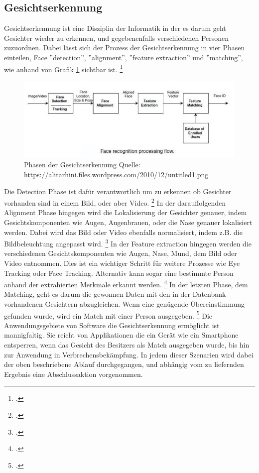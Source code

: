 \documentclass[12pt, a4paper]{scrbook}
\begin{document}
\subsection{Gesichtserkennung}
Gesichtserkennung ist eine Disziplin der Informatik in der es darum geht Gesichter wieder zu erkennen, und gegebenenfalls verschiedenen Personen zuzuordnen. Dabei lässt sich der Prozess der
Gesichtserkennung in vier Phasen einteilen, Face ''detection'', ''alignment'', ''feature extraction'' und ''matching'', wie anhand von Grafik \ref{fig:Face Recognition} sichtbar ist.
\footcite[Vgl. ][2]{HandbookFaceRec}
\begin{figure}[h]
\includegraphics[width=\linewidth]{Bilder/FaceRecognition.png}
\caption{ Phasen der Gesichtserkennung \newline Quelle: https://alitarhini.files.wordpress.com/2010/12/untitled1.png }
\label{fig:Face Recognition}
\end{figure}
Die Detection Phase ist dafür verantwortlich um zu erkennen ob Gesichter vorhanden sind in einem Bild, oder aber Video.
\footcite[Vgl. ][2]{HandbookFaceRec}
In der darauffolgenden Alignment Phase hingegen wird die Lokalisierung der Gesichter genauer, indem Gesichtskomponenten wie Augen, Augenbrauen, oder die Nase genauer lokalisiert werden. Dabei
wird das Bild oder Video ebenfalls normalisiert, indem z.B. die Bildbeleuchtung angepasst wird.
\footcite[Vgl. ][2]{HandbookFaceRec}
In der Feature extraction hingegen werden die verschiedenen Gesichtskomponenten wie Augen, Nase, Mund, dem Bild oder Video entnommen. Dies ist ein wichtiger Schritt für weitere Prozesse wie
Eye Tracking oder Face Tracking. Alternativ kann sogar eine bestimmte Person anhand der extrahierten Merkmale erkannt werden.
\footcite[Vgl. ][Abstract]{IEEE}
In der letzten Phase, dem Matching, geht es darum die gewonnen Daten mit den in der Datenbank vorhandenen Gesichtern abzugleichen. Wenn eine genügende Übereinstimmung gefunden wurde, wird ein
Match mit einer Person ausgegeben.
\footcite[Vgl. ][3]{HandbookFaceRec}
Die Anwendungsgebiete von Software die Gesichtserkennung ermöglicht ist mannigfaltig. Sie reicht von Applikationen die ein Gerät wie ein Smartphone entsperren, wenn das Gesicht des Besitzers als
Match ausgegeben wurde, bis hin zur Anwendung in Verbrechensbekämpfung. In jedem dieser Szenarien wird dabei der oben beschriebene Ablauf durchgegangen, und abhängig vom zu liefernden Ergebnis
eine Abschlussaktion vorgenommen.
\end{document}
